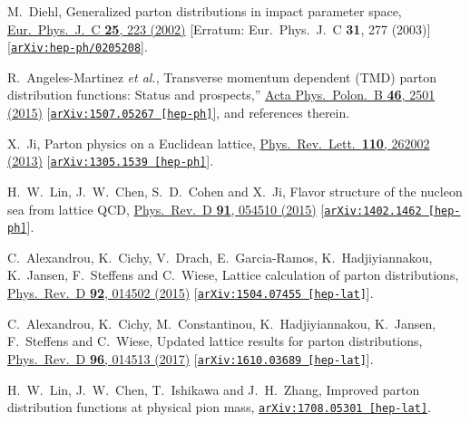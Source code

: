 \documentclass[aps,prd,preprint,groupedaddress]{revtex4-1}
\begin{document}
\begin{thebibliography}{99}
{\color{blue}  
  M.~Diehl,
  Generalized parton distributions in impact parameter space,
  \href{https://link.springer.com/article/10.1007%2Fs10052-002-1016-9}{Eur.\ Phys.\ J.\ C {\bf 25}, 223 (2002)}
  [Erratum: Eur.\ Phys.\ J.\ C {\bf 31}, 277 (2003)]  
  [\href{https://arxiv.org/abs/hep-ph/0205208}{\tt arXiv:hep-ph/0205208}].
  }

  R.~Angeles-Martinez {\it et al.},
  Transverse momentum dependent (TMD) parton distribution functions: Status and prospects,''
  \href{http://www.actaphys.uj.edu.pl/findarticle?series=Reg&vol=46&page=2501}{Acta Phys.\ Polon.\ B {\bf 46},  2501 (2015)}
  [\href{https://arxiv.org/abs/1507.05267}{\tt arXiv:1507.05267 [hep-ph]}], and references therein.
  

  X.~Ji,
  Parton physics on a Euclidean lattice,
  \href{https://journals.aps.org/prl/abstract/10.1103/PhysRevLett.110.262002}{Phys.\ Rev.\ Lett.\  {\bf 110}, 262002 (2013)}
  [\href{https://arxiv.org/abs/1305.1539}{\tt arXiv:1305.1539 [hep-ph]}].  
  
{\color{blue}  

\cite{Lin:2014zya}
  H.~W.~Lin, J.~W.~Chen, S.~D.~Cohen and X.~Ji,
  Flavor structure of the nucleon sea from lattice QCD,
  \href{https://journals.aps.org/prd/abstract/10.1103/PhysRevD.91.054510}{Phys.\ Rev.\ D {\bf 91}, 054510 (2015)}
  [\href{https://arxiv.org/abs/1402.1462}{\tt arXiv:1402.1462 [hep-ph]}].
  
  
  C.~Alexandrou, K.~Cichy, V.~Drach, E.~Garcia-Ramos, K.~Hadjiyiannakou, K.~Jansen, F.~Steffens and C.~Wiese,
  Lattice calculation of parton distributions,
  \href{https://journals.aps.org/prd/abstract/10.1103/PhysRevD.92.014502}{Phys.\ Rev.\ D {\bf 92}, 014502 (2015)}
  [\href{https://arxiv.org/abs/1504.07455}{\tt arXiv:1504.07455 [hep-lat]}].
  

  C.~Alexandrou, K.~Cichy, M.~Constantinou, K.~Hadjiyiannakou, K.~Jansen, F.~Steffens and C.~Wiese,
  Updated lattice results for parton distributions,
  \href{https://journals.aps.org/prd/abstract/10.1103/PhysRevD.96.014513}{Phys.\ Rev.\ D {\bf 96}, 014513 (2017)}
  [\href{https://arxiv.org/abs/1610.03689}{\tt arXiv:1610.03689 [hep-lat]}].  
  
 
H.~W.~Lin, J.~W.~Chen, T.~Ishikawa and J.~H.~Zhang,
Improved parton distribution functions at physical pion mass,
\href{https://arxiv.org/pdf/1708.05301.pdf}{\tt arXiv:1708.05301 [hep-lat]}.  
  
}
\end{thebibliography}
\end{document}
